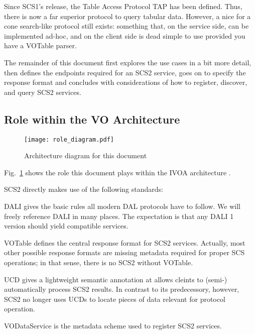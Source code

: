 \documentclass[11pt,a4paper]{ivoa}
\begin{document}
Since SCS1's release, the Table Access Protocol TAP
\citep{2019ivoa.spec.0927D} has been defined.  Thus, there is now a far
superior protocol to query tabular data.  However, a nice for a cone
search-like protocol still exists: something that, on the service side,
can be implemented ad-hoc, and on the client side is dead simple to use
provided you have a VOTable parser.

The remainder of this document first explores the use cases in a bit
more detail, then defines the endpoints required for an SCS2 service,
goes on to specify the response format and concludes with considerations
of how to register, discover, and query SCS2 services.

\subsection{Role within the VO Architecture}

\begin{figure}
\centering


\texttt{[image: role\_diagram.pdf]}
\caption{Architecture diagram for this document}
\label{fig:archdiag}
\end{figure}

Fig.~\ref{fig:archdiag} shows the role this document plays within the
IVOA architecture \citep{2021ivoa.spec.1101D}.

SCS2 directly makes use of the following standards:

\begin{bigdescription}
\item[DALI] \citet{2017ivoa.spec.0517D} gives the basic rules all modern
DAL protocols have to follow.  We will freely reference DALI in many
places.  The expectation is that any DALI 1 version should yield
compatible services.

\item[VOTable] \citet{2025ivoa.spec.0116O} defines the central response
format for SCS2 services.  Actually, most other possible response
formats are missing metadata required for proper SCS operations; in that
sense, there is no SCS2 without VOTable.

\item[UCD] \citet{2005ivoa.spec.0819D} gives a lightweight semantic
annotation at allows cleints to (semi-) automatically process SCS2
results.  In contrast to its predecessory, however, SCS2 no longer uses
UCDs to locate pieces of data relevant for protocol operation.

\item[VODataService] \citet{2021ivoa.spec.1102D} is the metadata scheme
used to register SCS2 services.

\end{bigdescription}
\end{document}
